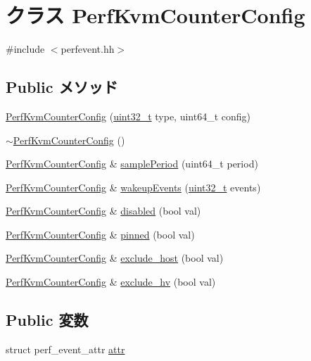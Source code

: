 \hypertarget{classPerfKvmCounterConfig}{
\section{クラス PerfKvmCounterConfig}
\label{classPerfKvmCounterConfig}
}


{\ttfamily \#include $<$perfevent.hh$>$}\subsection*{Public メソッド}
\begin{DoxyCompactItemize}
\item 
\hyperlink{classPerfKvmCounterConfig_a55ed8d9cf8254a7598c16bab27f50737}{PerfKvmCounterConfig} (\hyperlink{Type_8hh_a435d1572bf3f880d55459d9805097f62}{uint32\_\-t} type, uint64\_\-t config)
\item 
\hyperlink{classPerfKvmCounterConfig_a45c48015a9fef5897588400e50ce2ee3}{$\sim$PerfKvmCounterConfig} ()
\item 
\hyperlink{classPerfKvmCounterConfig}{PerfKvmCounterConfig} \& \hyperlink{classPerfKvmCounterConfig_a21da8ec8646ef482a43c9912690f12db}{samplePeriod} (uint64\_\-t period)
\item 
\hyperlink{classPerfKvmCounterConfig}{PerfKvmCounterConfig} \& \hyperlink{classPerfKvmCounterConfig_a52dc4277819e416e01e710c3fcd0741f}{wakeupEvents} (\hyperlink{Type_8hh_a435d1572bf3f880d55459d9805097f62}{uint32\_\-t} events)
\item 
\hyperlink{classPerfKvmCounterConfig}{PerfKvmCounterConfig} \& \hyperlink{classPerfKvmCounterConfig_ae9f6708c8ac2d38d1a259442dacf5ef9}{disabled} (bool val)
\item 
\hyperlink{classPerfKvmCounterConfig}{PerfKvmCounterConfig} \& \hyperlink{classPerfKvmCounterConfig_a6ff9b5b670a7713d60a49071544ef39d}{pinned} (bool val)
\item 
\hyperlink{classPerfKvmCounterConfig}{PerfKvmCounterConfig} \& \hyperlink{classPerfKvmCounterConfig_ae28830de9096ce653714c860182aa1ea}{exclude\_\-host} (bool val)
\item 
\hyperlink{classPerfKvmCounterConfig}{PerfKvmCounterConfig} \& \hyperlink{classPerfKvmCounterConfig_a267e4dd365a444393b1ccce9e564f7af}{exclude\_\-hv} (bool val)
\end{DoxyCompactItemize}
\subsection*{Public 変数}
\begin{DoxyCompactItemize}
\item 
struct perf\_\-event\_\-attr \hyperlink{classPerfKvmCounterConfig_aeae272195c5a5879b216cef6c7c909b2}{attr}
\end{DoxyCompactItemize}


